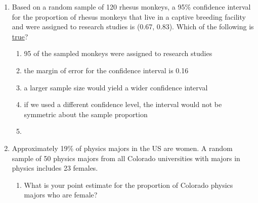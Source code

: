 \documentclass[12pt,fullpage]{amsart}
\begin{document}
\begin{enumerate}
\begin{enumerate}
\end{enumerate} 

      \vfill

\item Based on a random sample of 120 rhesus monkeys, a 95\% confidence interval for the proportion of rhesus monkeys that live in a captive breeding facility and were assigned to research studies is (0.67, 0.83).  Which of the following is \underline{true}?
\begin{enumerate}
\item	95 of the sampled monkeys were assigned to research studies

  
\item	the margin of error for the confidence interval is 0.16

  
\item	a larger sample size would yield a wider confidence interval


\item	if we used a different confidence level, the interval would not be symmetric about the sample proportion

  
\item	{}
\end{enumerate}

\vfill
  
\item Approximately 19\% of physics majors in the US are women. A random sample of 50 physics majors from all Colorado universities with majors in physics includes 23 females.
  \begin{enumerate}
  \item What is your point estimate for the proportion of Colorado physics majors who are female?


\end{enumerate}
\end{enumerate}
\end{document}
